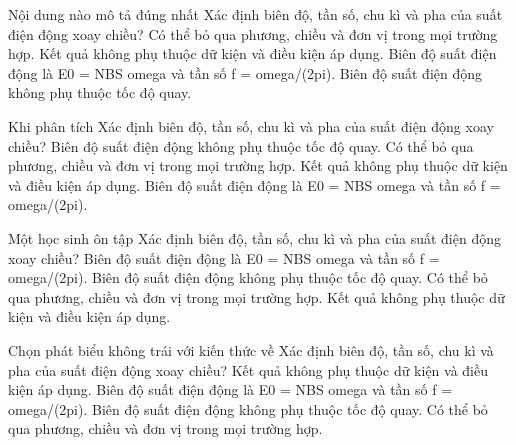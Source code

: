 \begin{ex}
Nội dung nào mô tả đúng nhất Xác định biên độ, tần số, chu kì và pha của suất điện động xoay chiều?
\choice
{Có thể bỏ qua phương, chiều và đơn vị trong mọi trường hợp.}
{Kết quả không phụ thuộc dữ kiện và điều kiện áp dụng.}
{\True Biên độ suất điện động là E0 = NBS omega và tần số f = omega/(2pi).}
{Biên độ suất điện động không phụ thuộc tốc độ quay.}
\end{ex}

\begin{ex}
Khi phân tích Xác định biên độ, tần số, chu kì và pha của suất điện động xoay chiều?
\choice
{Biên độ suất điện động không phụ thuộc tốc độ quay.}
{Có thể bỏ qua phương, chiều và đơn vị trong mọi trường hợp.}
{Kết quả không phụ thuộc dữ kiện và điều kiện áp dụng.}
{\True Biên độ suất điện động là E0 = NBS omega và tần số f = omega/(2pi).}
\end{ex}

\begin{ex}
Một học sinh ôn tập Xác định biên độ, tần số, chu kì và pha của suất điện động xoay chiều?
\choice
{\True Biên độ suất điện động là E0 = NBS omega và tần số f = omega/(2pi).}
{Biên độ suất điện động không phụ thuộc tốc độ quay.}
{Có thể bỏ qua phương, chiều và đơn vị trong mọi trường hợp.}
{Kết quả không phụ thuộc dữ kiện và điều kiện áp dụng.}
\end{ex}

\begin{ex}
Chọn phát biểu không trái với kiến thức về Xác định biên độ, tần số, chu kì và pha của suất điện động xoay chiều?
\choice
{Kết quả không phụ thuộc dữ kiện và điều kiện áp dụng.}
{\True Biên độ suất điện động là E0 = NBS omega và tần số f = omega/(2pi).}
{Biên độ suất điện động không phụ thuộc tốc độ quay.}
{Có thể bỏ qua phương, chiều và đơn vị trong mọi trường hợp.}
\end{ex}

